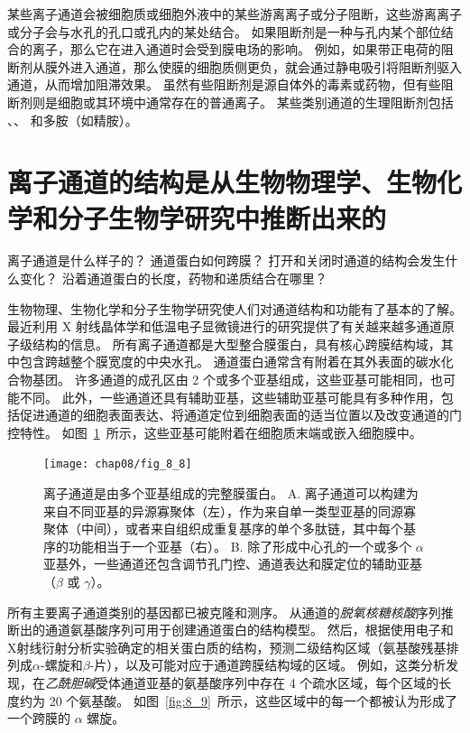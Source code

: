 某些离子通道会被细胞质或细胞外液中的某些游离离子或分子阻断，这些游离离子或分子会与水孔的孔口或孔内的某处结合。
如果阻断剂是一种与孔内某个部位结合的离子，那么它在进入通道时会受到膜电场的影响。
例如，如果带正电荷的阻断剂从膜外进入通道，那么使膜的细胞质侧更负，就会通过静电吸引将阻断剂驱入通道，从而增加阻滞效果。
虽然有些阻断剂是源自体外的毒素或药物，但有些阻断剂则是细胞或其环境中通常存在的普通离子。
某些类别通道的生理阻断剂包括 、、 和多胺（如精胺）。



\section{离子通道的结构是从生物物理学、生物化学和分子生物学研究中推断出来的}

离子通道是什么样子的？
通道蛋白如何跨膜？
打开和关闭时通道的结构会发生什么变化？
沿着通道蛋白的长度，药物和递质结合在哪里？


生物物理、生物化学和分子生物学研究使人们对通道结构和功能有了基本的了解。
最近利用 X 射线晶体学和低温电子显微镜进行的研究提供了有关越来越多通道原子级结构的信息。
所有离子通道都是大型整合膜蛋白，具有核心跨膜结构域，其中包含跨越整个膜宽度的中央水孔。
通道蛋白通常含有附着在其外表面的碳水化合物基团。 许多通道的成孔区由 2 个或多个亚基组成，这些亚基可能相同，也可能不同。
此外，一些通道还具有辅助亚基，这些辅助亚基可能具有多种作用，包括促进通道的细胞表面表达、将通道定位到细胞表面的适当位置以及改变通道的门控特性。
如图~\ref{fig:8_8}~所示，这些亚基可能附着在细胞质末端或嵌入细胞膜中。


\begin{figure}[htbp]
	\centering
	\texttt{[image: chap08/fig\_8\_8]}
	\caption{离子通道是由多个亚基组成的完整膜蛋白。
		A. 离子通道可以构建为来自不同亚基的异源寡聚体（左），作为来自单一类型亚基的同源寡聚体（中间），或者来自组织成重复基序的单个多肽链，其中每个基序的功能相当于一个亚基（右）。
		B. 除了形成中心孔的一个或多个 $\alpha$ 亚基外，一些通道还包含调节孔门控、通道表达和膜定位的辅助亚基（$\beta$ 或 $\gamma$）。}
	\label{fig:8_8}
\end{figure}


所有主要离子通道类别的基因都已被克隆和测序。
从通道的\textit{脱氧核糖核酸}序列推断出的通道氨基酸序列可用于创建通道蛋白的结构模型。
然后，根据使用电子和X射线衍射分析实验确定的相关蛋白质的结构，预测二级结构区域（氨基酸残基排列成$\alpha$-螺旋和$\beta$-片），以及可能对应于通道跨膜结构域的区域。
例如，这类分析发现，在\textit{乙酰胆碱}受体通道亚基的氨基酸序列中存在 4 个疏水区域，每个区域的长度约为 20 个氨基酸。
如图~\ref{fig:8_9}~所示，这些区域中的每一个都被认为形成了一个跨膜的 $\alpha$ 螺旋。


